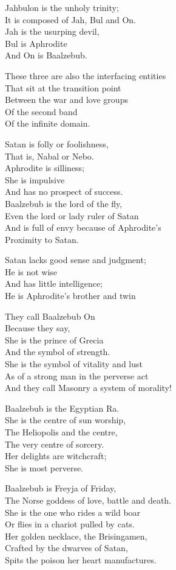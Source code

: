 \documentclass[
]{book}
\begin{document}
Jahbulon is the unholy trinity;\\
It is composed of Jah, Bul and On.\\
Jah is the usurping devil,\\
Bul is Aphrodite\\
And On is Baalzebub.

These three are also the interfacing entities\\
That sit at the transition point\\
Between the war and love groups\\
Of the second band\\
Of the infinite domain.

Satan is folly or foolishness,\\
That is, Nabal or Nebo.\\
Aphrodite is silliness;\\
She is impulsive\\
And has no prospect of success.\\
Baalzebub is the lord of the fly,\\
Even the lord or lady ruler of Satan\\
And is full of envy because of Aphrodite's\\
Proximity to Satan.

Satan lacks good sense and judgment;\\
He is not wise\\
And has little intelligence;\\
He is Aphrodite's brother and twin

They call Baalzebub On\\
Because they say,\\
She is the prince of Grecia\\
And the symbol of strength.\\
She is the symbol of vitality and lust\\
As of a strong man in the perverse act\\
And they call Masonry a system of morality!

Baalzebub is the Egyptian Ra.\\
She is the centre of sun worship,\\
The Heliopolis and the centre,\\
The very centre of sorcery.\\
Her delights are witchcraft;\\
She is most perverse.

Baalzebub is Freyja of Friday,\\
The Norse goddess of love, battle and death.\\
She is the one who rides a wild boar\\
Or flies in a chariot pulled by cats.\\
Her golden necklace, the Brisingamen,\\
Crafted by the dwarves of Satan,\\
Spits the poison her heart manufactures.
\end{document}

